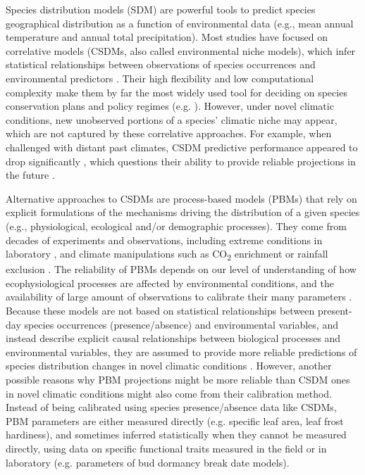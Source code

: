 \documentclass[pdflatex, sn-nature]{sn-jnl}%
\begin{document}
Species distribution models (SDM) are powerful tools to predict species geographical distribution as a function of environmental data (e.g., mean annual temperature and annual total precipitation). Most studies have focused on correlative models (CSDMs, also called environmental niche models), which infer statistical relationships between observations of species occurrences and environmental predictors \cite{Dormann2012}. Their high flexibility and low computational complexity make them by far the most widely used tool for deciding on species conservation plans and policy regimes (e.g. \cite{Hanewinkel2013}). However, under novel climatic conditions, new unobserved portions of a species’ climatic niche may appear, which are not captured by these correlative approaches. For example, when challenged with distant past climates, CSDM predictive performance appeared to drop significantly \cite{Maguire2016}, which questions their ability to provide reliable projections in the future \cite{Fitzpatrick2018}. 

Alternative approaches to CSDMs are process-based models (PBMs) that rely on explicit formulations of the mechanisms driving the distribution of a given species (e.g., physiological, ecological and/or demographic processes). They come from decades of experiments and observations, including extreme conditions in laboratory \cite{Seehausen2017}, and climate manipulations such as CO\textsubscript{2} enrichment \cite{Jiang2020} or rainfall exclusion \cite{Gavinet2019}. The reliability of PBMs depends on our level of understanding of how ecophysiological processes are affected by environmental conditions, and the availability of large amount of observations to calibrate their many parameters \cite{Evans2016}. Because these models are not based on statistical relationships between present-day species occurrences (presence/absence) and environmental variables, and instead describe explicit causal relationships between biological processes and environmental variables, they are assumed to provide more reliable predictions of species distribution changes in novel climatic conditions  \cite{Evans2012, Singer2016}. However, another possible reasons why PBM projections might be more reliable than CSDM ones in novel climatic conditions might also come from their calibration method. Instead of being calibrated using species presence/absence data like CSDMs, PBM parameters are either measured directly (e.g. specific leaf area, leaf frost hardiness), and sometimes inferred statistically when they cannot be measured directly, using data on specific functional traits measured in the field or in laboratory (e.g. parameters of bud dormancy break date models). 
\end{document}
